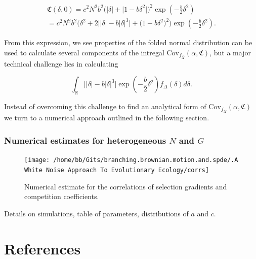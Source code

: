 \documentclass[]{article}
\begin{document}
\begin{multline}
\mathfrak{C}(\delta,0)=c^2N^2b^2\Big(|\delta|+\big|1-b\delta^2\big|\Big)^2\exp\left(-\frac{b}{2}\delta^2\right) \\
=c^2N^2b^2\Big(\delta^2+2\big||\delta|-b|\delta|^3\big|+\big(1-b\delta^2\big)^2\Big)\exp\left(-\frac{b}{2}\delta^2\right).
\end{multline}

From this expression, we see properties of the folded normal
distribution can be used to calculate several components of the intregal
\(\mathrm{Cov}_{f_{\bar X}}(\alpha,\mathfrak{C})\), but a major
technical challenge lies in calculating

\begin{equation}
\int_{\mathbb{R}}\big||\delta|-b|\delta|^3\big|\exp\left(-\frac{b}{2}\delta^2\right)f_{\Delta}(\delta)d\delta.
\end{equation}

Instead of overcoming this challenge to find an analytical form of
\(\mathrm{Cov}_{f_{\bar X}}(\alpha,\mathfrak{C})\) we turn to a
numerical approach outlined in the following section.

\hypertarget{numerical-estimates-for-heterogeneous-n-and-g}{%
\subsubsection{\texorpdfstring{Numerical estimates for heterogeneous
\(N\) and
\(G\)}{Numerical estimates for heterogeneous N and G}}\label{numerical-estimates-for-heterogeneous-n-and-g}}

\begin{figure}

{\centering \texttt{[image: /home/bb/Gits/branching.brownian.motion.and.spde/.A White Noise Approach To Evolutionary Ecology/corrs]} 

}

\caption{Numerical estimate for the correlations of selection gradients and competition coefficients.}\label{fig:unnamed-chunk-13}
\end{figure}

Details on simulations, table of parameters, distributions of \(a\) and
\(c\).

\newpage

\hypertarget{references}{%
\section*{References}\label{references}}
\end{document}
